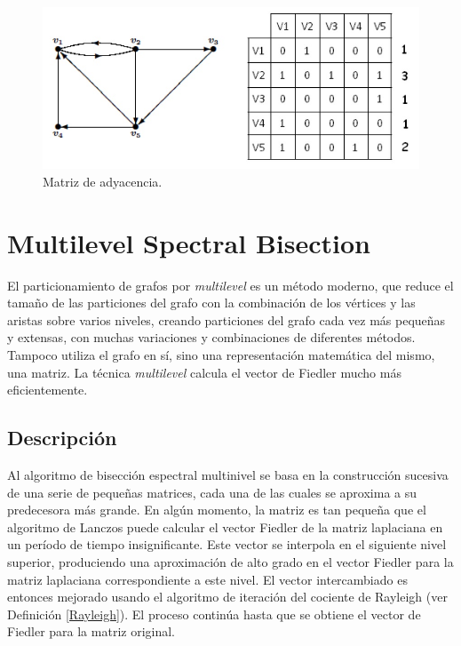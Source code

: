 \begin{figure}[h]
	\centering
	\includegraphics[scale=0.45]{Figures/matriz}
	\vspace{1mm}
	\caption{Matriz de adyacencia.}
	\label{matriz_adyacencia}
\end{figure}

\section{Multilevel Spectral Bisection}\label{Multilevel-Spectral-Bisection}

El particionamiento de grafos por \textit{multilevel} es un método moderno, que reduce el tamaño de las particiones del grafo con la combinación de los vértices y las aristas sobre varios niveles, creando particiones del grafo cada vez más pequeñas y extensas, con muchas variaciones y combinaciones de diferentes métodos. Tampoco utiliza el grafo en sí, sino una representación matemática del mismo, una matriz. La técnica \textit{multilevel} calcula el vector de Fiedler\cite{Fiedler} mucho más eficientemente.

\subsection{Descripción}\label{msb_description}

Al algoritmo de bisección espectral multinivel se basa en la construcción sucesiva de una serie de pequeñas matrices, cada una de las cuales se aproxima a su predecesora más grande. En algún momento, la matriz es tan pequeña que el algoritmo de Lanczos\cite{Lanczos} puede calcular el vector Fiedler\cite{Fiedler} de la matriz laplaciana en un período de tiempo insignificante. Este vector se interpola en el siguiente nivel superior, produciendo una aproximación de alto grado en el vector Fiedler para la matriz laplaciana correspondiente a este nivel. El vector intercambiado es entonces mejorado usando el algoritmo de iteración del cociente de Rayleigh (ver Definición \ref{Rayleigh}). El proceso continúa hasta que se obtiene el vector de Fiedler para la matriz original.

